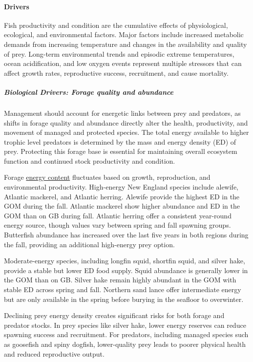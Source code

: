 \documentclass[
  10pt,
]{article}
\begin{document}
\paragraph{Drivers}\label{drivers-2}

Fish productivity and condition are the cumulative effects of physiological, ecological, and environmental factors. Major factors include increased metabolic demands from increasing temperature and changes in the availability and quality of prey. Long-term environmental trends and episodic extreme temperatures, ocean acidification, and low oxygen events represent multiple stressors that can affect growth rates, reproductive success, recruitment, and cause mortality.

\subparagraph{Biological Drivers: Forage quality and abundance}\label{biological-drivers-forage-quality-and-abundance}

Management should account for energetic links between prey and predators, as shifts in forage quality and abundance directly alter the health, productivity, and movement of managed and protected species. The total energy available to higher trophic level predators is determined by the mass and energy density (ED) of prey. Protecting this forage base is essential for maintaining overall ecosystem function and continued stock productivity and condition.

Forage \href{https://noaa-edab.github.io/catalog/energy_density.html}{energy content} fluctuates based on growth, reproduction, and environmental productivity. High-energy New England species include alewife, Atlantic mackerel, and Atlantic herring. Alewife provide the highest ED in the GOM during the fall. Atlantic mackerel show higher abundance and ED in the GOM than on GB during fall. Atlantic herring offer a consistent year-round energy source, though values vary between spring and fall spawning groups. Butterfish abundance has increased over the last five years in both regions during the fall, providing an additional high-energy prey option.

Moderate-energy species, including longfin squid, shortfin squid, and silver hake, provide a stable but lower ED food supply. Squid abundance is generally lower in the GOM than on GB. Silver hake remain highly abundant in the GOM with stable ED across spring and fall. Northern sand lance offer intermediate energy but are only available in the spring before burying in the seafloor to overwinter.

Declining prey energy density creates significant risks for both forage and predator stocks. In prey species like silver hake, lower energy reserves can reduce spawning success and recruitment. For predators, including managed species such as goosefish and spiny dogfish, lower-quality prey leads to poorer physical health and reduced reproductive output.
\end{document}
